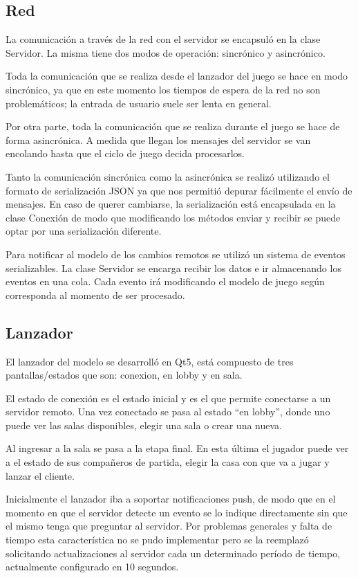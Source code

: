 \documentclass[titlepage,a4paper,12pt]{article}
\begin{document}
\subsection{Red}
La comunicación a través de la red con el servidor se encapsuló en la clase Servidor. La misma tiene dos modos de operación: sincrónico y asincrónico. 

Toda la comunicación que se realiza desde el lanzador del juego se hace en modo sincrónico, ya que en este momento los tiempos de espera de la red no son problemáticos; la entrada de usuario suele ser lenta en general.

Por otra parte, toda la comunicación que se realiza durante el juego se hace de forma asincrónica. A medida que llegan los mensajes del servidor se van encolando hasta que el ciclo de juego decida procesarlos.

Tanto la comunicación sincrónica como la asincrónica se realizó utilizando el formato de serialización JSON ya que nos permitió depurar fácilmente el envío de mensajes. En caso de querer cambiarse, la serialización está encapsulada en la clase Conexión de modo que modificando los métodos enviar y recibir se puede optar por una serialización diferente.

Para notificar al modelo de los cambios remotos se utilizó un sistema de eventos serializables. La clase Servidor se encarga recibir los datos e ir almacenando los eventos en una cola. Cada evento irá modificando el modelo de juego según corresponda al momento de ser procesado.

\subsection{Lanzador}
El lanzador del modelo se desarrolló en Qt5, está compuesto de tres pantallas/estados que son: conexion, en lobby y en sala. 

El estado de conexión es el estado inicial y es el que permite conectarse a un servidor remoto. Una vez conectado se pasa al estado ``en lobby'', donde uno puede ver las salas disponibles, elegir una sala o crear una nueva.

Al ingresar a la sala se pasa a la etapa final. En esta última el jugador puede ver a el estado de sus compañeros de partida, elegir la casa con que va a jugar y lanzar el cliente.

Inicialmente el lanzador iba a soportar notificaciones push, de modo que en el momento en que el servidor detecte un evento se lo indique directamente sin que el mismo tenga que preguntar al servidor. Por problemas generales y falta de tiempo esta característica no se pudo implementar pero se la reemplazó solicitando actualizaciones al servidor cada un determinado período de tiempo, actualmente configurado en 10 segundos.
\end{document}
